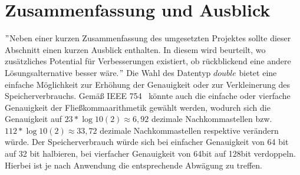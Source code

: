 \documentclass[course=erap]{aspdoc}
\begin{document}
    \section{Zusammenfassung und Ausblick}
    \("\)Neben einer kurzen Zusammenfassung des umgesetzten Projektes sollte dieser Abschnitt einen kurzen Ausblick enthalten.
    In diesem wird beurteilt, wo zusätzliches Potential für Verbesserungen existiert, ob rückblickend eine andere
    Lösungsalternative besser wäre.\("\)
    Die Wahl des Datentyp $double$ bietet eine einfache Möglichkeit zur Erhöhung der Genauigkeit oder zur Verkleinerung des Speicherverbrauchs.
    Gemäß IEEE 754~\cite{StandardforBinaryFloating-PointArithmetic} könnte auch die einfache oder vierfache Genauigkeit der
    Fließkommaarithmetik gewählt werden, wodurch sich die Genauigkeit auf $23*\log10(2) \approx 6,92$ dezimale Nachkommastellen
    bzw. $112*\log10(2) \approx 33,72$ dezimale Nachkommastellen respektive verändern würde.
    Der Speicherverbrauch würde sich bei einfacher Genauigkeit von 64 bit auf 32 bit halbieren, bei vierfacher Genauigkeit von 64bit auf 128bit verdoppeln.
    Hierbei ist je nach Anwendung die entsprechende Abwägung zu treffen.


    
    
\end{document}
